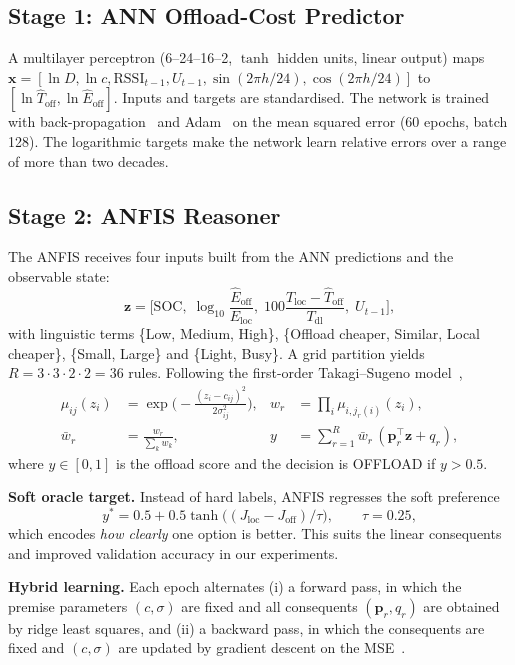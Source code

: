 \documentclass[conference]{IEEEtran}
\newcommand{\Jl}{J_{\mathrm{loc}}}
\newcommand{\Jo}{J_{\mathrm{off}}}
\begin{document}
\subsection{Stage 1: ANN Offload-Cost Predictor}
A multilayer perceptron (6--24--16--2, $\tanh$ hidden units, linear output) maps
$\mathbf{x}=[\ln D,\ln c,\mathrm{RSSI}_{t-1},U_{t-1},\sin(2\pi h/24),\cos(2\pi h/24)]$ to
$[\ln \hat T_{\mathrm{off}}, \ln \hat E_{\mathrm{off}}]$. Inputs and targets are standardised. The network is trained with
back-propagation~\cite{rumelhart1986learning} and Adam~\cite{kingma2015adam} on the mean squared error (60 epochs, batch 128).
The logarithmic targets make the network learn relative errors over a range of more than two decades.

\subsection{Stage 2: ANFIS Reasoner}
The ANFIS receives four inputs built from the ANN predictions and the observable state:
\begin{equation}
\mathbf{z} = \Big[\mathrm{SOC},\;
\log_{10}\frac{\hat E_{\mathrm{off}}}{E_{\mathrm{loc}}},\;
100\frac{T_{\mathrm{loc}}-\hat T_{\mathrm{off}}}{T_{\mathrm{dl}}},\;
U_{t-1}\Big],
\end{equation}
with linguistic terms \{Low, Medium, High\}, \{Offload cheaper, Similar, Local cheaper\}, \{Small, Large\} and \{Light, Busy\}.
A grid partition yields $R=3\cdot3\cdot2\cdot2=36$ rules. Following the first-order Takagi--Sugeno model~\cite{takagi1985fuzzy,jang1993anfis},
\begin{align}
\mu_{ij}(z_i) &= \exp\!\Big(-\frac{(z_i-c_{ij})^2}{2\sigma_{ij}^2}\Big), &
w_r &= \prod_{i}\mu_{i,j_r(i)}(z_i),\\
\bar w_r &= \frac{w_r}{\sum_k w_k}, &
y &= \sum_{r=1}^{R}\bar w_r\,(\mathbf{p}_r^\top\mathbf{z}+q_r),
\end{align}
where $y\in[0,1]$ is the offload score and the decision is OFFLOAD if $y>0.5$.

\textbf{Soft oracle target.} Instead of hard labels, ANFIS regresses the soft preference
\begin{equation}
y^\ast = 0.5 + 0.5\tanh\!\big((\Jl-\Jo)/\tau\big),\qquad \tau=0.25,
\end{equation}
which encodes \emph{how clearly} one option is better. This suits the linear consequents and improved validation accuracy in our
experiments.

\textbf{Hybrid learning.} Each epoch alternates (i) a forward pass, in which the premise parameters $(c,\sigma)$ are fixed and all
consequents $(\mathbf{p}_r,q_r)$ are obtained by ridge least squares, and (ii) a backward pass, in which the consequents are fixed and
$(c,\sigma)$ are updated by gradient descent on the MSE~\cite{jang1993anfis}.
\end{document}
